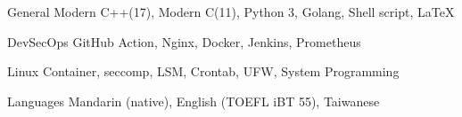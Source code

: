 

\begin{cvskills}

    \cvskill
    {General} %
    {Modern C++(17), Modern C(11), Python 3, Golang, Shell script, LaTeX} %

    \cvskill
    {DevSecOps} %
    {GitHub Action, Nginx, Docker, Jenkins, Prometheus} %


    \cvskill
    {Linux} %
    {Container, seccomp, LSM, Crontab, UFW, System Programming} %

    \cvskill
    {Languages} %
    {Mandarin (native), English (TOEFL iBT 55), Taiwanese} %

\end{cvskills}